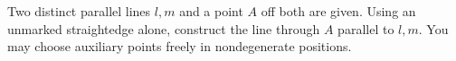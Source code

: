 Two distinct parallel lines $l,m$ and a point $A$ off both are given. Using an unmarked straightedge alone, construct the line through $A$ parallel to $l,m$. You may choose auxiliary points freely in nondegenerate positions.
